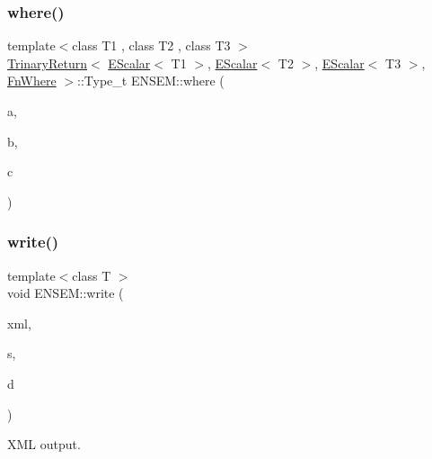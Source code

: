 \subsubsection{\texorpdfstring{where()}{where()}}
{\footnotesize\ttfamily template$<$class T1 , class T2 , class T3 $>$ \\
\mbox{\hyperlink{structENSEM_1_1TrinaryReturn}{Trinary\+Return}}$<$ \mbox{\hyperlink{classENSEM_1_1EScalar}{E\+Scalar}}$<$ T1 $>$, \mbox{\hyperlink{classENSEM_1_1EScalar}{E\+Scalar}}$<$ T2 $>$, \mbox{\hyperlink{classENSEM_1_1EScalar}{E\+Scalar}}$<$ T3 $>$, \mbox{\hyperlink{structENSEM_1_1FnWhere}{Fn\+Where}} $>$\+::Type\+\_\+t E\+N\+S\+E\+M\+::where (\begin{DoxyParamCaption}\item[{const \mbox{\hyperlink{classENSEM_1_1EScalar}{E\+Scalar}}$<$ T1 $>$ \&}]{a,  }\item[{const \mbox{\hyperlink{classENSEM_1_1EScalar}{E\+Scalar}}$<$ T2 $>$ \&}]{b,  }\item[{const \mbox{\hyperlink{classENSEM_1_1EScalar}{E\+Scalar}}$<$ T3 $>$ \&}]{c }\end{DoxyParamCaption})\hspace{0.3cm}{\ttfamily [inline]}}

\mbox{\label{group__escalar_ga2e7afe18081ed96c569177362d6bb43d}} 
\subsubsection{\texorpdfstring{write()}{write()}}
{\footnotesize\ttfamily template$<$class T $>$ \\
void E\+N\+S\+E\+M\+::write (\begin{DoxyParamCaption}\item[{\mbox{\hyperlink{classADATXML_1_1XMLWriter}{A\+D\+A\+T\+X\+M\+L\+::\+X\+M\+L\+Writer}} \&}]{xml,  }\item[{const std\+::string \&}]{s,  }\item[{const \mbox{\hyperlink{classENSEM_1_1EScalar}{E\+Scalar}}$<$ T $>$ \&}]{d }\end{DoxyParamCaption})\hspace{0.3cm}{\ttfamily [inline]}}



X\+ML output. 

